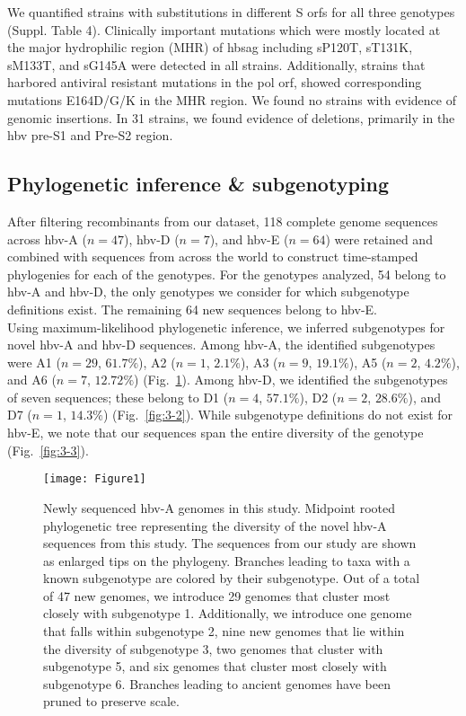 We quantified strains with substitutions in different S \gls{orf}s for all three genotypes (Suppl. Table 4).
Clinically important mutations which were mostly located at the major hydrophilic region (MHR) of \gls{hbsag} including sP120T, sT131K, sM133T, and sG145A were detected in all strains.
Additionally, strains that harbored antiviral resistant mutations in the pol \gls{orf}, showed corresponding mutations E164D/G/K in the MHR region.
We found no strains with evidence of genomic insertions.
In 31 strains, we found evidence of deletions, primarily in the \gls{hbv} pre-S1 and Pre-S2 region.

\subsection{Phylogenetic inference \& subgenotyping}
After filtering recombinants from our dataset, 118 complete genome sequences across \gls{hbv}-A ($n=47$), \gls{hbv}-D ($n=7$), and \gls{hbv}-E ($n=64$) were retained and combined with sequences from across the world to construct time-stamped phylogenies for each of the genotypes.
For the genotypes analyzed, 54 belong to \gls{hbv}-A and \gls{hbv}-D, the only genotypes we consider for which subgenotype definitions exist.
The remaining 64 new sequences belong to \gls{hbv}-E.\\

Using maximum-likelihood phylogenetic inference, we inferred subgenotypes for novel \gls{hbv}-A and \gls{hbv}-D sequences.
Among \gls{hbv}-A, the identified subgenotypes were A1 ($n=29$, $61.7\%$), A2 ($n=1$, $2.1\%$), A3 ($n=9$, $19.1\%$), A5 ($n=2$, $4.2\%$), and A6 ($n=7$, $12.72\%$) (Fig.~\ref{fig:3-1}).
Among \gls{hbv}-D, we identified the subgenotypes of seven sequences; these belong to D1 ($n=4$, $57.1\%$), D2 ($n=2$, $28.6\%$), and D7 ($n=1$, $14.3\%$) (Fig.~\ref{fig:3-2}).
While subgenotype definitions do not exist for \gls{hbv}-E, we note that our sequences span the entire diversity of the genotype (Fig.~\ref{fig:3-3}).\\

\begin{figure}[ht]
  \centering
  \texttt{[image: Figure1]}
  \caption[HBV-A new sequences]{Newly sequenced \gls{hbv}-A genomes in this study. Midpoint rooted phylogenetic tree representing the diversity of the novel \gls{hbv}-A sequences from this study. The sequences from our study are shown as enlarged tips on the phylogeny. Branches leading to taxa with a known subgenotype are colored by their subgenotype. Out of a total of 47 new genomes, we introduce 29 genomes that cluster most closely with subgenotype 1. Additionally, we introduce one genome that falls within subgenotype 2, nine new genomes that lie within the diversity of subgenotype 3, two genomes that cluster with subgenotype 5, and six genomes that cluster most closely with subgenotype 6. Branches leading to ancient genomes have been pruned to preserve scale.}
  \label{fig:3-1}
\end{figure}

